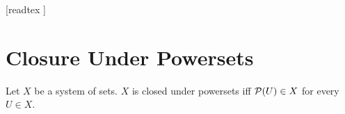 \documentclass[10pt]{article}
\begin{document}
  \begin{imports}
    \begin{forthel}
      [readtex ]
    \end{forthel}
  \end{imports}


  \section*{Closure Under Powersets}

  \begin{forthel}
    \begin{definition}[id=FOUNDATIONS_14_4652013578120594,printid]
      Let $X$ be a system of sets.
      $X$ is closed under powersets iff $\mathcal{P}(U) \in X$ for every $U \in X$.
    \end{definition}
  \end{forthel}
\end{document}

